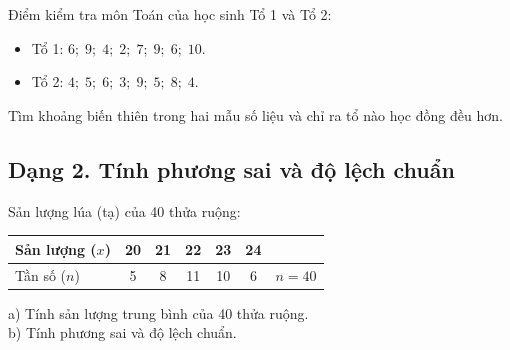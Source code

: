 \begin{vd}
	Điểm kiểm tra môn Toán của học sinh Tổ 1 và Tổ 2:
	\begin{itemize}
		\item Tổ 1: $6;\; 9;\; 4;\; 2;\; 7;\; 9;\; 6;\; 10$.
		\item Tổ 2: $4;\; 5;\; 6;\; 3;\; 9;\; 5;\; 8;\; 4$.
	\end{itemize}
	Tìm khoảng biến thiên trong hai mẫu số liệu và chỉ ra tổ nào học đồng đều hơn.
\end{vd}

\subsection*{Dạng 2. Tính phương sai và độ lệch chuẩn}

\begin{vd}
	Sản lượng lúa (tạ) của 40 thửa ruộng:
	\begin{center}
	\begin{tabular}{|l|c|c|c|c|c|c|}
		\hline
		Sản lượng ($x$) & 20 & 21 & 22 & 23 & 24 & \\
		\hline
		Tần số ($n$) & 5 & 8 & 11 & 10 & 6 & $n = 40$ \\
		\hline
	\end{tabular}
	\end{center}
	a) Tính sản lượng trung bình của 40 thửa ruộng.\\
	b) Tính phương sai và độ lệch chuẩn.
\end{vd}

